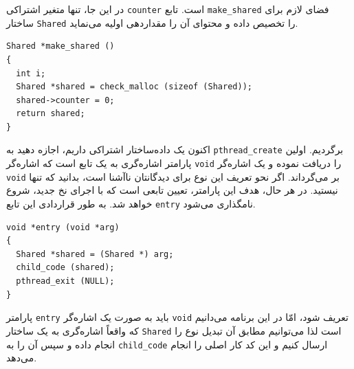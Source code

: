 \documentclass{book}
\begin{document}
    در این جا، تنها متغیر اشتراکی  {\tt counter}  است. تابع {\tt make\_shared}  فضای لازم برای ساختار  {\tt Shared} را تخصیص داده و 
    محتوای آن را مقداردهی اولیه می‌نماید. 

\begin{latin}
\begin{lstlisting}
Shared *make_shared ()
{
  int i;
  Shared *shared = check_malloc (sizeof (Shared));
  shared->counter = 0;
  return shared;
}
\end{lstlisting}
\end{latin}

    اکنون یک داده‌ساختار اشتراکی داریم، اجازه دهید  به {\tt pthread\_create} برگردیم. 
    اولین پارامتر اشاره‌گری به یک تابع است که اشاره‌گر {\tt void} را دریافت نموده و یک اشاره‌گر {\tt void} بر می‌گرداند. 
    اگر نحو تعریف این نوع برای دیدگانتان ناآشنا است، بدانید که تنها نیستید. 
    در هر حال، هدف این پارامتر، تعیین تابعی است که با اجرای نخ جدید، شروع خواهد شد. به طور قراردادی این تابع  {\tt entry} نامگذاری می‌شود. 

\begin{latin}
\begin{lstlisting}
void *entry (void *arg)
{
  Shared *shared = (Shared *) arg;
  child_code (shared);
  pthread_exit (NULL);
}
\end{lstlisting}
\end{latin}

    پارامتر {\tt entry}  باید به صورت یک اشاره‌گر  {\tt void} تعریف شود،‌ امّا در این برنامه می‌دانیم که واقعاً اشاره‌گری به یک ساختار {\tt Shared}  است 
    لذا می‌توانیم مطابق آن تبدیل نوع را انجام داده و سپس آن را به {\tt child\_code} ارسال کنیم و این کد کار اصلی را انجام می‌دهد. 
\end{document}

